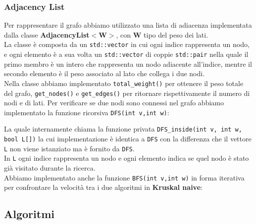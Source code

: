 \documentclass[]{article}
\begin{document}
\subsubsection{Adjacency List}
\begin{flushleft}
Per rappresentare il grafo abbiamo utilizzato una lista di adiacenza implementata dalla classe \textbf{AdjacencyList$<$W$>$}, con \textbf{W} tipo del peso dei lati.\\
La classe è composta da un \verb|std::vector| in cui ogni indice rappresenta un nodo, e ogni elemento è a sua volta un \verb|std::vector| di coppie \verb|std::pair| nella quale il primo membro è un intero che rappresenta un nodo adiacente all'indice, mentre il secondo elemento è il peso associato al lato che collega i due nodi.\\
Nella classe abbiamo implementato \verb|total_weight()| per ottenere il peso totale del grafo, \verb|get_nodes()| e \verb|get_edges()| per ritornare rispettivamente il numero di nodi e di lati.
Per verificare se due nodi sono connessi nel grafo abbiamo implementato la funzione ricorsiva \verb|DFS(int v,int w)|:
\lstset{language=c++, style=mystyle}

La quale internamente chiama la funzione privata \verb|DFS_inside(int v, int w, bool L[])| la cui implementazione è identica a \verb|DFS| con la differenza che il vettore \verb|L| non viene istanziato ma è fornito da \verb|DFS|.\\
In \verb|L| ogni indice rappresenta un nodo e ogni elemento indica se quel nodo è stato già visitato durante la ricerca.\\
Abbiamo implementato anche la funzione \verb|BFS(int v,int w)| in forma iterativa per confrontare la velocità tra i due algoritmi in \textbf{Kruskal naive}:
\lstset{language=c++, style=mystyle}

\end{flushleft}

\newpage

\subsection{Algoritmi}
\end{document}
